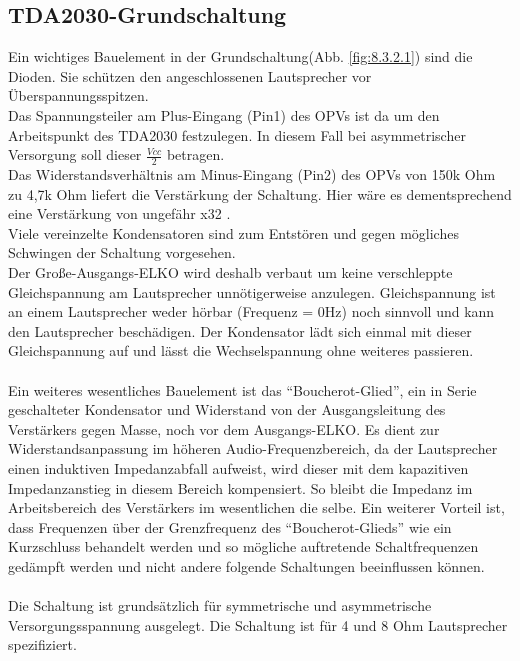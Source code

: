 \subsection{TDA2030-Grundschaltung}\label{subsec:8.3.2}
Ein wichtiges Bauelement in der Grundschaltung(Abb. \ref{fig:8.3.2.1}) sind die Dioden. Sie schützen den angeschlossenen Lautsprecher vor Überspannungsspitzen.\\
Das Spannungsteiler am Plus-Eingang (Pin1) des OPVs ist da um den Arbeitspunkt des TDA2030 festzulegen.
In diesem Fall bei asymmetrischer Versorgung soll dieser $\frac{Vcc}{2}$ betragen.\\
Das Widerstandsverhältnis am Minus-Eingang (Pin2) des OPVs von 150k Ohm zu 4,7k Ohm liefert die Verstärkung der Schaltung.
Hier wäre es dementsprechend eine Verstärkung von ungefähr x32 .\\
Viele vereinzelte Kondensatoren sind zum Entstören und gegen mögliches Schwingen der Schaltung vorgesehen.\\
Der Große-Ausgangs-ELKO wird deshalb verbaut um keine verschleppte Gleichspannung am Lautsprecher unnötigerweise anzulegen.
Gleichspannung ist an einem Lautsprecher weder hörbar (Frequenz = 0Hz) noch sinnvoll und kann den Lautsprecher beschädigen.
Der Kondensator lädt sich einmal mit dieser Gleichspannung auf und lässt die Wechselspannung ohne weiteres passieren.\\\\
Ein weiteres wesentliches Bauelement ist das \enquote{Boucherot-Glied}, ein in Serie geschalteter Kondensator und Widerstand von der Ausgangsleitung des Verstärkers gegen Masse, noch vor dem Ausgangs-ELKO.
Es dient zur Widerstandsanpassung im höheren Audio-Frequenzbereich, da der Lautsprecher einen induktiven Impedanzabfall aufweist, wird dieser mit dem kapazitiven Impedanzanstieg in diesem Bereich kompensiert.
So bleibt die Impedanz im Arbeitsbereich des Verstärkers im wesentlichen die selbe.
Ein weiterer Vorteil ist, dass Frequenzen über der Grenzfrequenz des \enquote{Boucherot-Glieds} wie ein Kurzschluss behandelt werden und so mögliche auftretende Schaltfrequenzen gedämpft werden und nicht andere folgende Schaltungen beeinflussen können.\\\\
Die Schaltung ist grundsätzlich für symmetrische und asymmetrische Versorgungsspannung ausgelegt. 
Die Schaltung ist für 4 und 8 Ohm Lautsprecher spezifiziert.
